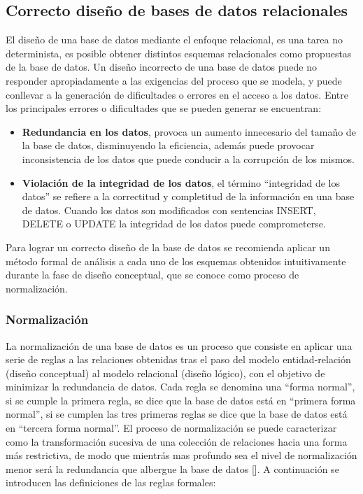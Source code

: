 
\subsection{Correcto diseño de bases de datos relacionales}

El diseño de una base de datos mediante el enfoque relacional, es una 
tarea no determinista, es posible obtener distintos esquemas relacionales 
como propuestas de la base de datos.
Un diseño incorrecto de una base de datos puede no responder apropiadamente a las exigencias
del proceso que se modela, y puede conllevar a la generación de dificultades o 
errores en el acceso a los datos. Entre los principales errores o dificultades que se pueden generar
se encuentran:

\begin{itemize}
    \item \textbf{Redundancia en los datos}, provoca un aumento innecesario 
    del tamaño de la base de datos, disminuyendo la eficiencia, además puede provocar 
    inconsistencia de los datos que puede conducir a la corrupción de los mismos. 
    \item \textbf{Violación de la integridad de los datos}, el término ``integridad de los datos'' se 
    refiere a la correctitud y completitud de la información en una base de datos. Cuando los datos son 
    modificados con sentencias INSERT, DELETE o UPDATE la integridad de los datos puede comprometerse.
\end{itemize}



Para lograr un correcto diseño de la base de datos se recomienda aplicar un método formal de 
análisis a cada uno de los esquemas obtenidos intuitivamente durante la fase de diseño conceptual, 
que se conoce como proceso de normalización.

\subsubsection{Normalización}
La normalización de una base de datos es un proceso que consiste 
en aplicar una serie de reglas a las relaciones obtenidas 
tras el paso del modelo entidad-relación (diseño conceptual) al modelo 
relacional (diseño lógico), con el objetivo de minimizar la redundancia de datos.
Cada regla se denomina una ``forma normal'', si se cumple la primera regla, se dice que 
la base de datos está en ``primera forma normal'', si se cumplen las tres 
primeras reglas se dice que la base de datos está en ``tercera forma normal''. El proceso de 
normalización se puede caracterizar como la transformación sucesiva de una colección de 
relaciones hacia una forma más restrictiva, de modo que mientrás mas profundo sea el nivel 
de normalización menor será la redundancia que albergue la base de datos [\cite{db_book_cap4}].
A continuación se introducen las definiciones de las reglas formales:

